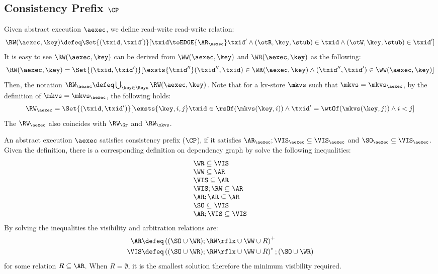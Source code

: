 \subsection{Consistency Prefix \( \CP \) }
\label{sec:sound-complete-cp}

Given abstract execution \( \aexec \), we define read-write read-write relation:
\[
    \RW(\aexec,\key) \defeq \Set{(\txid, \txid')}[\txid \toEDGE{\AR_\aexec} \txid' \land (\otR,\key, \stub ) \in \txid \land (\otW,\key, \stub ) \in \txid' ] 
\]
It is easy to see \( \RW(\aexec,\key) \)  can be derived from \( \WW(\aexec,\key) \) and \( \WR(\aexec, \key ) \) as the following:
\[
    \RW(\aexec,\key) = \Set{(\txid, \txid')}[ \exsts{\txid'' } (\txid'', \txid) \in \WR(\aexec, \key) \land (\txid'', \txid') \in \WW(\aexec, \key) ]
\]
Then, the notation \( \RW_\aexec \defeq \bigcup_{\key \in \Keys} \RW(\aexec, \key) \).
Note that for a kv-store \( \mkvs \) such that \( \mkvs = \mkvs_\aexec \),
by the definition of  \(  \mkvs = \mkvs_\aexec \), 
the following holds:
\[
    \RW_\aexec = \Set{(\txid, \txid')}[\exsts{\key, i,j } \txid \in \rsOf(\mkvs(\key, i)) \land \txid' = \wtOf(\mkvs(\key, j)) \land i < j]
\]
The \( \RW_\aexec \) also coincides with \( \RW_\Gr \) and \( \RW_\mkvs \).


An abstract execution \( \aexec \) satisfies consistency prefix (\(\CP\)), 
if it satisfies \( \AR_\aexec ; \VIS_\aexec \subseteq \VIS_\aexec \) and \( \SO_\aexec \subseteq \VIS_\aexec \).
Given the definition, there is a corresponding definition on dependency graph by solve the following inequalities:
\[
    \begin{array}{@{}l@{}}
        \WR \subseteq \VIS \\
        \WW \subseteq \AR \\
        \VIS \subseteq \AR \\
        \VIS ; \RW \subseteq \AR \\
        \AR ; \AR \subseteq \AR  \\
        \SO \subseteq \VIS \\
        \AR ; \VIS \subseteq \VIS
    \end{array}
\]
By solving the inequalities the visibility and arbitration relations are:
\begin{align*}
    \AR  & \defeq \left( (\SO \cup \WR ) ; \RW\rflx \cup \WW \cup R \right)^+ \\
    \VIS & \defeq \left( (\SO \cup \WR ) ; \RW\rflx \cup \WW \cup R \right)^* ; (\SO \cup \WR )
\end{align*}
for some relation \( R \subseteq \AR \).
When \( R = \emptyset \), it is the smallest solution therefore the minimum visibility required.

